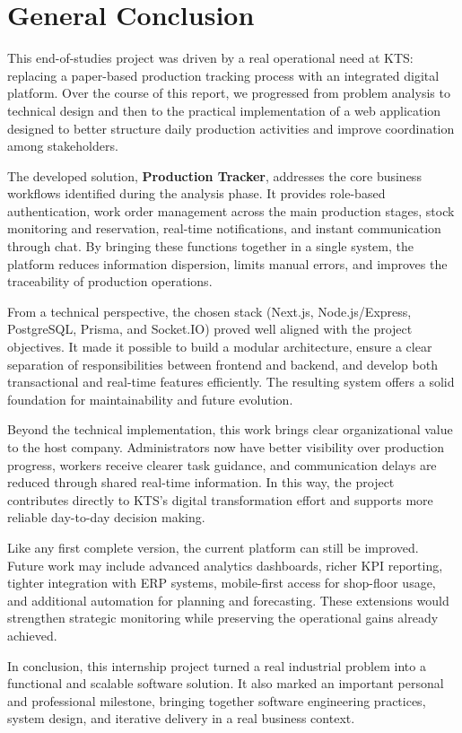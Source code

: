 \chapter*{General Conclusion}

This end-of-studies project was driven by a real operational need at KTS: replacing a paper-based production tracking process with an integrated digital platform. Over the course of this report, we progressed from problem analysis to technical design and then to the practical implementation of a web application designed to better structure daily production activities and improve coordination among stakeholders.

The developed solution, \textbf{Production Tracker}, addresses the core business workflows identified during the analysis phase. It provides role-based authentication, work order management across the main production stages, stock monitoring and reservation, real-time notifications, and instant communication through chat. By bringing these functions together in a single system, the platform reduces information dispersion, limits manual errors, and improves the traceability of production operations.

From a technical perspective, the chosen stack (Next.js, Node.js/Express, PostgreSQL, Prisma, and Socket.IO) proved well aligned with the project objectives. It made it possible to build a modular architecture, ensure a clear separation of responsibilities between frontend and backend, and develop both transactional and real-time features efficiently. The resulting system offers a solid foundation for maintainability and future evolution.

Beyond the technical implementation, this work brings clear organizational value to the host company. Administrators now have better visibility over production progress, workers receive clearer task guidance, and communication delays are reduced through shared real-time information. In this way, the project contributes directly to KTS's digital transformation effort and supports more reliable day-to-day decision making.

Like any first complete version, the current platform can still be improved. Future work may include advanced analytics dashboards, richer KPI reporting, tighter integration with ERP systems, mobile-first access for shop-floor usage, and additional automation for planning and forecasting. These extensions would strengthen strategic monitoring while preserving the operational gains already achieved.

In conclusion, this internship project turned a real industrial problem into a functional and scalable software solution. It also marked an important personal and professional milestone, bringing together software engineering practices, system design, and iterative delivery in a real business context.
